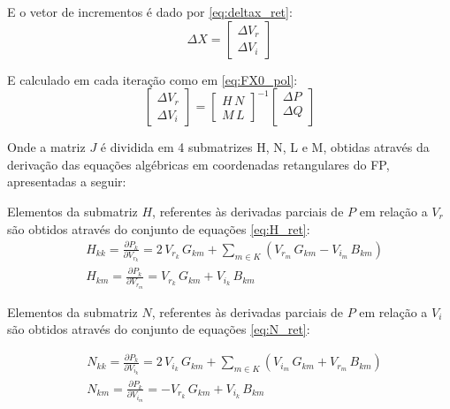 E o vetor de incrementos é dado por \eqref{eq:deltax_ret}:
\begin{equation}\label{eq:deltax_ret}
    \Delta X = 
    \begin{bmatrix}
    \Delta V_r\\
    \Delta V_i
    \end{bmatrix}
\end{equation}

E calculado em cada iteração como em \eqref{eq:FX0_pol}:
\begin{equation}\label{eq:FX0_pol}
    \begin{bmatrix}
        \Delta V_r\\
        \Delta V_i
    \end{bmatrix}
    =
    \begin{bmatrix}
        H\,N\\
        M\,L
    \end{bmatrix}
    ^{-1}
    \begin{bmatrix}
        \Delta P\\
        \Delta Q\\
    \end{bmatrix}
\end{equation}

Onde a matriz $J$ é dividida em 4 submatrizes H, N, L e M, obtidas através da derivação das equações algébricas em coordenadas retangulares do \ac{FP}, apresentadas a seguir:

Elementos da submatriz $H$, referentes às derivadas parciais de $P$ em relação a $V_r$ são obtidos através do conjunto de equações \eqref{eq:H_ret}:
\begin{equation} \label{eq:H_ret}
    \begin{split}
        &H_{kk} = \frac{\partial P_k}{\partial V_{r_k}}=
        2\,V_{r_k}\,G_{km}+\sum_{m \in K} \left(V_{r_m}\,G_{km} - V_{i_m}\,B_{km} \right)\\
        &H_{km} = \frac{\partial P_k}{\partial V_{r_m}} =
        V_{r_k}\,G_{km}+V_{i_k}\,B_{km}
    \end{split}
\end{equation}

Elementos da submatriz $N$, referentes às derivadas parciais de $P$ em relação a $V_i$ são obtidos através do conjunto de equações \eqref{eq:N_ret}:

\begin{equation} \label{eq:N_ret}
    \begin{split}
        &N_{kk} = \frac{\partial P_k}{\partial V_{i_k}}=
        2\,V_{i_k}\,G_{km}+\sum_{m \in K} \left(V_{i_m}\,G_{km} + V_{r_m}\,B_{km} \right)\\
        &N_{km} = \frac{\partial P_k}{\partial V_{i_m}}=
        -V_{r_k}\,G_{km}+V_{i_k}\,B_{km}
    \end{split}
\end{equation}

